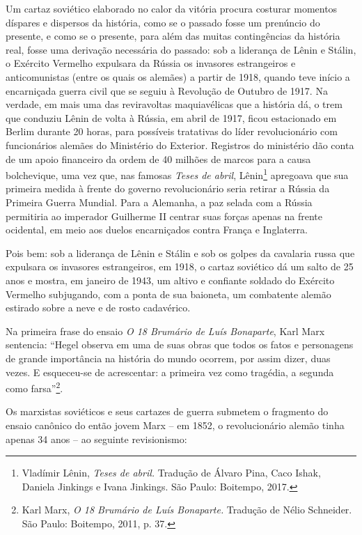 Um cartaz soviético elaborado no calor da vitória procura costurar
momentos díspares e dispersos da história, como se o passado fosse um
prenúncio do presente, e como se o presente, para além das muitas
contingências da história real, fosse uma derivação necessária do
passado: sob a liderança de Lênin e Stálin, o Exército Vermelho
expulsara da Rússia os invasores estrangeiros e anticomunistas (entre os
quais os alemães) a partir de 1918, quando teve início a encarniçada
guerra civil que se seguiu à Revolução de Outubro de 1917. Na verdade,
em mais uma das reviravoltas maquiavélicas que a história dá, o trem que
conduziu Lênin de volta à Rússia, em abril de 1917, ficou estacionado em
Berlim durante 20 horas, para possíveis tratativas do líder
revolucionário com funcionários alemães do Ministério do Exterior.
Registros do ministério dão conta de um apoio financeiro da ordem de 40
milhões de marcos para a causa bolchevique, uma vez que, nas famosas
\emph{Teses de abril}, Lênin\footnote{Vladímir Lênin, \emph{Teses de
  abril.} Tradução de Álvaro Pina, Caco Ishak, Daniela Jinkings e Ivana
  Jinkings. São Paulo: Boitempo, 2017.} apregoava que sua primeira
medida à frente do governo revolucionário seria retirar a Rússia da
Primeira Guerra Mundial. Para a Alemanha, a paz selada com a Rússia
permitiria ao imperador Guilherme II centrar suas forças apenas na
frente ocidental, em meio aos duelos encarniçados contra França e
Inglaterra.

Pois bem: sob a liderança de Lênin e Stálin e sob os golpes da cavalaria
russa que expulsara os invasores estrangeiros, em 1918, o cartaz
soviético dá um salto de 25 anos e mostra, em janeiro de 1943, um altivo
e confiante soldado do Exército Vermelho subjugando, com a ponta de sua
baioneta, um combatente alemão estirado sobre a neve e de rosto
cadavérico.

Na primeira frase do ensaio \emph{O 18 Brumário de Luís Bonaparte}, Karl
Marx sentencia: ``Hegel observa em uma de suas obras que todos os fatos
e personagens de grande importância na história do mundo ocorrem, por
assim dizer, duas vezes. E esqueceu-se de acrescentar: a primeira vez
como tragédia, a segunda como farsa''\footnote{Karl Marx, \emph{O 18
  Brumário de Luís Bonaparte.} Tradução de Nélio Schneider. São Paulo:
  Boitempo, 2011, p. 37.}.

Os marxistas soviéticos e seus cartazes de guerra submetem o fragmento
do ensaio canônico do então jovem Marx -- em 1852, o revolucionário
alemão tinha apenas 34 anos -- ao seguinte revisionismo:

